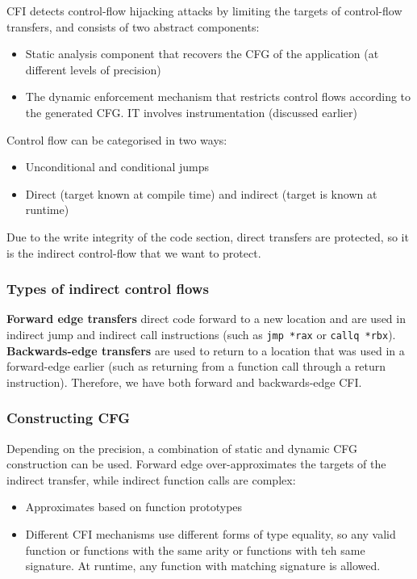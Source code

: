 \documentclass[11pt,a4paper,titlepage,dvipsnames,cmyk]{scrartcl}
\begin{document}
CFI detects control-flow hijacking attacks by limiting the targets of control-flow transfers, and consists of two abstract components:
\begin{itemize}
    \item Static analysis component that recovers the CFG of the application (at different levels of precision)
    \item The dynamic enforcement mechanism that restricts control flows according to the generated CFG. IT involves instrumentation (discussed earlier)
\end{itemize}

Control flow can be categorised in two ways:
\begin{itemize}
    \item Unconditional and conditional jumps
    \item Direct (target known at compile time) and indirect (target is known at runtime)
\end{itemize}

Due to the write integrity of the code section, direct transfers are protected, so it is the indirect control-flow that we want to protect.

\subsubsection{Types of indirect control flows}
\textbf{Forward edge transfers} direct code forward to a new location and are used in indirect jump and indirect call instructions (such as \texttt{jmp *rax} or \texttt{callq *rbx}). \textbf{Backwards-edge transfers} are used to return to a location that was used in a forward-edge earlier (such as returning from a function call through a return instruction). Therefore, we have both forward and backwards-edge CFI.

\subsubsection{Constructing CFG}
Depending on the precision, a combination of static and dynamic CFG construction can be used. Forward edge over-approximates the targets of the indirect transfer, while indirect function calls are complex:
\begin{itemize}
    \item Approximates based on function prototypes
    \item Different CFI mechanisms use different forms of type equality, so any valid function or functions with the same arity or functions with teh same signature. At runtime, any function with matching signature is allowed.
\end{itemize}
\end{document}
